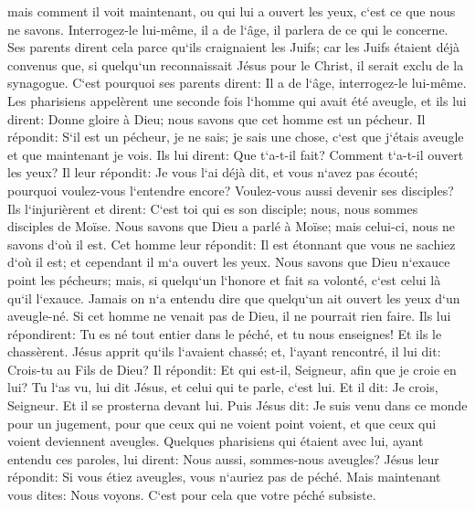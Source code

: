 \verse mais comment il voit maintenant, ou qui lui a ouvert les yeux, c`est ce que nous ne savons. Interrogez-le lui-même, il a de l`âge, il parlera de ce qui le concerne. 
\verse Ses parents dirent cela parce qu`ils craignaient les Juifs; car les Juifs étaient déjà convenus que, si quelqu`un reconnaissait Jésus pour le Christ, il serait exclu de la synagogue. 
\verse C`est pourquoi ses parents dirent: Il a de l`âge, interrogez-le lui-même. 
\verse Les pharisiens appelèrent une seconde fois l`homme qui avait été aveugle, et ils lui dirent: Donne gloire à Dieu; nous savons que cet homme est un pécheur. 
\verse Il répondit: S`il est un pécheur, je ne sais; je sais une chose, c`est que j`étais aveugle et que maintenant je vois. 
\verse Ils lui dirent: Que t`a-t-il fait? Comment t`a-t-il ouvert les yeux? 
\verse Il leur répondit: Je vous l`ai déjà dit, et vous n`avez pas écouté; pourquoi voulez-vous l`entendre encore? Voulez-vous aussi devenir ses disciples? 
\verse Ils l`injurièrent et dirent: C`est toi qui es son disciple; nous, nous sommes disciples de Moïse. 
\verse Nous savons que Dieu a parlé à Moïse; mais celui-ci, nous ne savons d`où il est. 
\verse Cet homme leur répondit: Il est étonnant que vous ne sachiez d`où il est; et cependant il m`a ouvert les yeux. 
\verse Nous savons que Dieu n`exauce point les pécheurs; mais, si quelqu`un l`honore et fait sa volonté, c`est celui là qu`il l`exauce. 
\verse Jamais on n`a entendu dire que quelqu`un ait ouvert les yeux d`un aveugle-né. 
\verse Si cet homme ne venait pas de Dieu, il ne pourrait rien faire. 
\verse Ils lui répondirent: Tu es né tout entier dans le péché, et tu nous enseignes! Et ils le chassèrent. 
\verse Jésus apprit qu`ils l`avaient chassé; et, l`ayant rencontré, il lui dit: Crois-tu au Fils de Dieu? 
\verse Il répondit: Et qui est-il, Seigneur, afin que je croie en lui? 
\verse Tu l`as vu, lui dit Jésus, et celui qui te parle, c`est lui. 
\verse Et il dit: Je crois, Seigneur. Et il se prosterna devant lui. 
\verse Puis Jésus dit: Je suis venu dans ce monde pour un jugement, pour que ceux qui ne voient point voient, et que ceux qui voient deviennent aveugles. 
\verse Quelques pharisiens qui étaient avec lui, ayant entendu ces paroles, lui dirent: Nous aussi, sommes-nous aveugles? 
\verse Jésus leur répondit: Si vous étiez aveugles, vous n`auriez pas de péché. Mais maintenant vous dites: Nous voyons. C`est pour cela que votre péché subsiste. 

